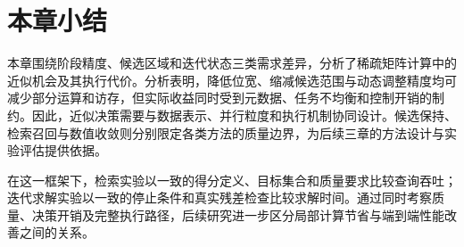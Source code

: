 

\section{本章小结}
本章围绕阶段精度、候选区域和迭代状态三类需求差异，分析了稀疏矩阵计算中的近似机会及其执行代价。分析表明，降低位宽、缩减候选范围与动态调整精度均可减少部分运算和访存，但实际收益同时受到元数据、任务不均衡和控制开销的制约。因此，近似决策需要与数据表示、并行粒度和执行机制协同设计。候选保持、检索召回与数值收敛则分别限定各类方法的质量边界，为后续三章的方法设计与实验评估提供依据。

在这一框架下，检索实验以一致的得分定义、目标集合和质量要求比较查询吞吐；迭代求解实验以一致的停止条件和真实残差检查比较求解时间。通过同时考察质量、决策开销及完整执行路径，后续研究进一步区分局部计算节省与端到端性能改善之间的关系。
